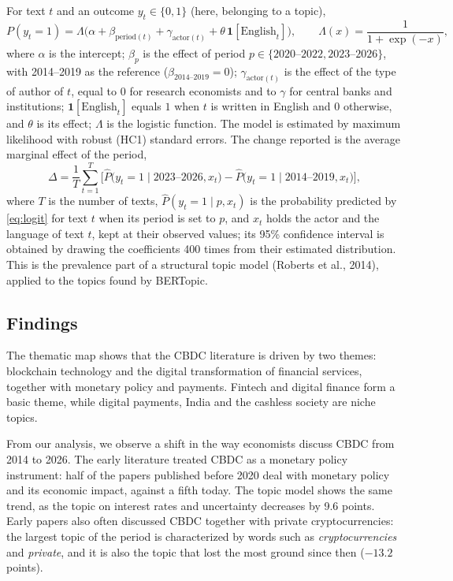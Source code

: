 \documentclass[11pt,a4paper]{article}
\begin{document}
For text $t$ and an outcome $y_t \in \{0,1\}$ (here, belonging to a topic),
\begin{equation}\label{eq:logit}
P(y_t = 1) = \Lambda\big(\alpha + \beta_{\text{period}(t)} + \gamma_{\text{actor}(t)} + \theta\,\mathbf{1}[\text{English}_t]\big),
\qquad \Lambda(x) = \frac{1}{1+\exp(-x)},
\end{equation}
where $\alpha$ is the intercept; $\beta_p$ is the effect of period $p \in \{\text{2020--2022}, \text{2023--2026}\}$, with 
2014--2019 as the reference ($\beta_{\text{2014--2019}} = 0$); $\gamma_{\text{actor}(t)}$ is the effect of the type of author of $t$, 
equal to $0$ for research economists and to $\gamma$ for central banks and institutions; $\mathbf{1}[\text{English}_t]$ equals $1$ 
when $t$ is written in English and $0$ otherwise, and $\theta$ is its effect; $\Lambda$ is the logistic function. The model is 
estimated by maximum likelihood with robust (HC1) standard errors. The change reported is the average marginal effect of the period,
\begin{equation}\label{eq:ame}
\Delta = \frac{1}{T}\sum_{t=1}^{T}\Big[\hat P\big(y_t = 1 \mid \text{2023--2026}, x_t\big) - \hat P\big(y_t = 1 \mid \text{2014--2019}, x_t\big)\Big],
\end{equation}
where $T$ is the number of texts, $\hat P(y_t = 1 \mid p, x_t)$ is the probability predicted by \cref{eq:logit} for text $t$ when its 
period is set to $p$, and $x_t$ holds the actor and the language of text $t$, kept at their observed values; its 95\% confidence interval is obtained by drawing the coefficients 400 times from their estimated distribution. This is the prevalence part of a structural topic model (Roberts et al., 2014), applied to the topics found by BERTopic.



\subsection{Findings}

The thematic map shows that the CBDC literature is driven by two themes: blockchain technology 
and the digital transformation of financial services, together with monetary policy and payments. 
Fintech and digital finance form a basic theme, while digital payments, India and the cashless 
society are niche topics. 



From our analysis, we observe a shift in the way economists discuss CBDC from 2014 to 2026. The 
early literature treated CBDC as a monetary policy instrument: half of the papers published before 
2020 deal with monetary policy and its economic impact, against a fifth today. The topic model shows 
the same trend, as the topic on interest rates and uncertainty decreases by 9.6 points. Early papers 
also often discussed CBDC together with private cryptocurrencies: the largest topic of the period is 
characterized by words such as \emph{cryptocurrencies} and \emph{private}, and it is also the topic 
that lost the most ground since then ($-13.2$ points).
\end{document}
